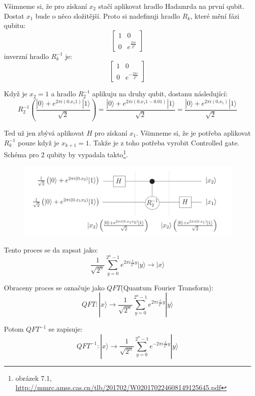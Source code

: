 \documentclass[11pt]{article}
\begin{document}
\par Všimneme si, že pro získaní $x_2$ stačí aplikovat hradlo Hadamrda na první qubit.
Dostat $x_1$ bude o něco složitější.
Proto si nadefinuji hradlo $R_k$, které mění fázi qubitu:
$$
    \begin{bmatrix}
        1 & 0                       \\
        0 & e^{\frac{2 \pi i}{2^k}}
    \end{bmatrix}
$$
inverzní hradlo $R_k^{-1}$ je:
$$
    \begin{bmatrix}
        1 & 0                        \\
        0 & e^{-\frac{2 \pi i}{2^k}}
    \end{bmatrix}
$$
\par Když je $x_2 = 1$ a hradlo $R_2^{-1}$ aplikuju na druhy qubit, dostanu následující:
$$
    R_2^{-1}\left(\frac{|0\rangle + e^{2\pi i (0.x_1 1)}|1\rangle}{\sqrt{2}}\right) =
    \frac{|0\rangle + e^{2\pi i (0.x_1 1 - 0.01)}|1\rangle}{\sqrt{2}} =
    \frac{|0\rangle + e^{2\pi i (0.x_1)}|1\rangle}{\sqrt{2}}
$$
\par Ted už jen zbývá aplikovat $H$ pro získaní $x_1$.
Všimneme si, že je potřeba aplikovat $R_k^{-1}$ pouze když je $x_{k + 1} = 1$.
Takže je z toho potřeba vyrobit Controlled gate.
Schéma pro 2 qubity by vypadala takto\footnote{obrázek 7.1, \url{http://mmrc.amss.cas.cn/tlb/201702/W020170224608149125645.pdf}}.
\begin{figure}[H]
    \includegraphics[scale=.6]{phase_estimation}
    \centering
\end{figure}
\par Tento proces se da zapsat jako:
$$\frac{1}{\sqrt{2^n}}\displaystyle\sum_{y=0}^{2^n - 1} e^{2\pi i \frac{x}{2^n} y}|y\rangle \to |x\rangle$$
\par Obraceny proces se označuje jako $QFT$(Quantum Fourier Transform):
$$QFT:|x\rangle \to \frac{1}{\sqrt{2^n}}\displaystyle\sum_{y=0}^{2^n - 1} e^{2\pi i \frac{x}{2^n} y}|y\rangle$$
\par Potom $QFT^{-1}$ se zapisuje:
$$QFT^{-1}:|x\rangle \to \frac{1}{\sqrt{2^n}}\displaystyle\sum_{y=0}^{2^n - 1} e^{-2\pi i \frac{x}{2^n} y}|y\rangle$$
\end{document}
